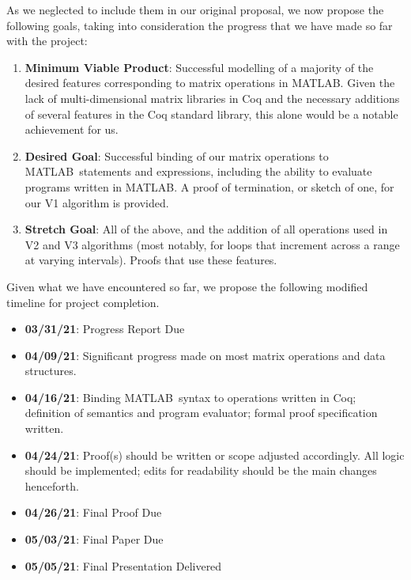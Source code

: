 \documentclass[11pt,conference]{IEEEtran}
\newcommand{\matlab}{MATLAB}
\newcommand{\mmatlab}{\textmu\matlab}
\begin{document}
As we neglected to include them in our original proposal, we now propose the
following goals, taking into consideration the progress that we have made so far
with the project:

\begin{enumerate}

    \item \textbf{Minimum Viable Product}: Successful modelling of a majority of
        the desired features corresponding to matrix operations in \mmatlab\@.
        Given the lack of multi-dimensional matrix libraries in Coq and the
        necessary additions of several features in the Coq standard library,
        this alone would be a notable achievement for us.

    \item \textbf{Desired Goal}: Successful binding of our matrix operations to
        \mmatlab\ statements and expressions, including the ability to evaluate
        programs written in \mmatlab\@. A proof of termination, or sketch of
        one, for our V1 algorithm is provided.

    \item \textbf{Stretch Goal}: All of the above, and the addition of all
        operations used in V2 and V3 algorithms (most notably, for loops that
        increment across a range at varying intervals). Proofs that use
        these features.

\end{enumerate}

Given what we have encountered so far, we propose the following modified
timeline for project completion.

\begin{itemize}
    \item \textbf{03/31/21}: Progress Report Due
    \item \textbf{04/09/21}: Significant progress made on most matrix operations
        and data structures.
    \item \textbf{04/16/21}: Binding \mmatlab\ syntax to operations written
        in Coq; definition of semantics and program evaluator; formal proof
        specification written.
    \item \textbf{04/24/21}: Proof(s) should be written or scope adjusted
        accordingly. All logic should be implemented; edits for readability
        should be the main changes henceforth.
    \item \textbf{04/26/21}: Final Proof Due
    \item \textbf{05/03/21}: Final Paper Due
    \item \textbf{05/05/21}: Final Presentation Delivered
\end{itemize}
\end{document}
